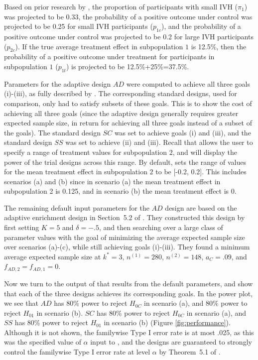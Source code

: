 \documentclass[article]{jss}
\begin{document}
Based on prior research by \cite{Hanley2012}, the proportion of participants with small IVH ($π_1$) was projected to be 0.33, the probability of a positive outcome under control was projected to be 0.25 for small IVH participants ($p_{1c}$), and the probability of a positive outcome under control was projected to be  0.2 for large IVH participants ($p_{2c}$).  If the true average treatment effect in subpopulation $1$ is 12.5\%, then the probability of a positive outcome under treatment for participants in subpopulation $1$ ($p_{1t}$) is projected to be 12.5\%+25\%=37.5\%.

Parameters for the adaptive design $AD$ were computed to achieve all three goals (i)-(iii), as fully described by \citep{Rosenblum2013AdaptMISTIE}. The corresponding standard designs, used for comparison, only had to satisfy subsets of these goals. This is to show the cost of achieving all three goals (since the adaptive design generally requires greater expected sample size, in return for achieving all three goals instead of a subset of the goals). 
The standard design $SC$ was set to achieve goals (i) and (iii), and the standard design $SS$ was set to achieve (ii) and (iii). Recall that  allows the user to specify a range of treatment values for subpopulation $2$, and will display the power of the trial designs across this range. By default,  sets the range of values for the mean treatment effect in subpopulation $2$ to be [-0.2, 0.2]. This includes scenarios (a) and (b) since in scenario (a) the mean treatment effect in subpopulation 2 is 0.125, and in scenario (b) the mean treatment effect is $0$. %
 
The remaining default input parameters for the $AD$ design are based on the adaptive enrichment design in Section~5.2 of \citep{Rosenblum2013AdaptMISTIE}. 
They constructed this design by first setting  $K=5$ and $δ=-.5$, and then searching over a large class of parameter values with the goal of minimizing the average expected sample size over scenarios (a)-(c), while still achieving goals (i)-(iii). They found a minimum average expected sample size at $k^*=3$, $n^{(1)}=280$, $n^{(2)}=148$, $a_C = .09$, and $f_{AD,2}=f_{AD,1}=0$. %


Now we turn to the output of  that results from the default parameters, and show that each of the three designs achieves its corresponding goals. In the power plot, we see that $AD$ has 80\% power to reject $H_{0C}$ in scenario (a), and 80\% power to reject $H_{01}$ in scenario (b). $SC$ has 80\% power to reject $H_{0C}$ in scenario (a), and $SS$ has 80\% power to reject $H_{01}$ in scenario (b) (Figure \ref{fig:performance}). Although it is not shown,  the familywise Type I error rate is at most  .025, as this was the specified value of $\alpha$ input to , and the designs are guaranteed to strongly control the familywise Type I error rate at level $\alpha$ by
 Theorem~5.1 of  \citep{Rosenblum2013AdaptMISTIE}.
\end{document}
